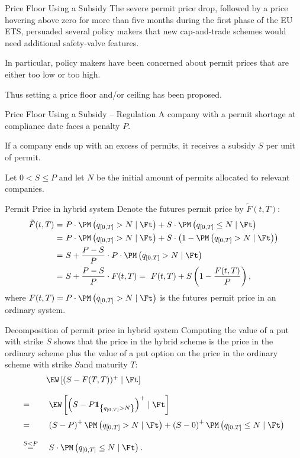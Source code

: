 Price Floor Using a Subsidy
	The severe permit price drop, followed by a price hovering above zero for more than five months during the first phase of the EU ETS, 
	persuaded several policy makers that new cap-and-trade schemes would need additional safety-valve features.
	
	In particular, policy makers have been concerned about permit prices that are either too low or too high.

	Thus setting a price floor and/or ceiling has been proposed.


Price Floor Using a Subsidy -- Regulation
	A company with a permit shortage at compliance date faces a penalty $P$.
	
	If a company ends up with an excess of permits, it receives a subsidy $S$ per unit of permit.
	
	Let $0<S\leq P$ and let $N$ be the initial amount of permits allocated to relevant companies.


Permit Price in hybrid system
	Denote the futures permit price by $\tilde{F}(t,T)$:
		\begin{align*}
		\tilde{F}(t,T) =& \ P \cdot \PM \left( q_{[0,T]} > N \mid \Ft \right) + S \cdot \PM \left( q_{[0,T]} \le N \mid \Ft \right) \\
			=& \ P \cdot \PM \left( q_{[0,T]} > N \mid \Ft \right) + S \cdot \left( 1 - \PM \left( q_{[0,T]} > N \mid \Ft \right)\right) \\
			=& \ S + \frac{P-S}{P} \cdot P \cdot \PM \left( q_{[0,T]} > N \mid \Ft \right) \\
			=& \ S + \frac{P-S}{P} \cdot F(t,T) = \ F(t,T) + S\left(1 - \frac{F(t,T)}{P}\right),
		\end{align*}
	where $F(t,T) = P \cdot \PM \left( q_{[0,T]} > N \mid \Ft \right)$ is the futures permit price in an ordinary system.


Decomposition of permit price in hybrid system
	Computing the value of a put with strike $S$ shows that the price in the hybrid scheme is the price in the ordinary scheme plus the 
	value of a put option on the price in the ordinary scheme with strike $S$and maturity $T$:
		$$
		\begin{array}{ll}
		&\EW\left[ (S-F(T,T))^+ \mid \Ft \right]\\*[12pt]
		=& \ \EW\left[ \left( S- P \textbf{1}_{\left\{ q_{[0,T]} > N \right\}} \right)^+ \mid \Ft \right] \\*[12pt]
		=& \ \left( S- P \right)^+ \PM \left( q_{[0,T]} > N \mid \Ft \right) + \left( S- 0 \right)^+ \PM \left( q_{[0,T]} \le N \mid \Ft \right) \\*[12pt]
		\stackrel{S<P}{=}& \ S \cdot \PM \left( q_{[0,T]} \le N \mid \Ft \right).
		\end{array}
		$$


